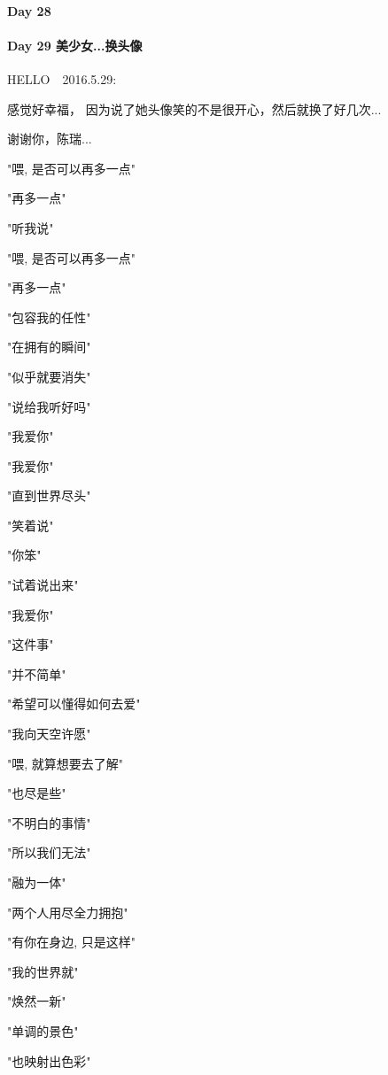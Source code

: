 \documentclass[UTF8,a4paper,8pt]{ctexbook}
\begin{document}
 	 \paragraph{Day 28      \quad     }
 	 \paragraph{Day 29  美少女...换头像  \quad     }
 	 HELLO　2016.5.29:
 	 
	 	 感觉好幸福， 因为说了她头像笑的不是很开心，然后就换了好几次... 
	 	 
	 	 谢谢你，陈瑞... 
	 	 
	 	 "喂, 是否可以再多一点"
	 	 
	 	 "再多一点"
	 	 
	 	 "听我说"
	 	 
	 	 "喂, 是否可以再多一点"
	 	 
	 	 "再多一点"
	 	 
	 	 "包容我的任性"
	 	 
	 	 "在拥有的瞬间"
	 	 
	 	 "似乎就要消失"
	 	 
	 	 "说给我听好吗"  
	 	 
	 	 "我爱你"
	 	 
	 	 "我爱你"
	 	 
	 	 "直到世界尽头"
	 	 
	 	 "笑着说"
	 	 
	 	 "你笨"
	 	 
	 	 "试着说出来"
	 	 
	 	 "我爱你" 
	 	 
	 	 "这件事"
	 	 
	 	 "并不简单"
	 	 
	 	 "希望可以懂得如何去爱"
	 	 
	 	 "我向天空许愿"
	 	 
	 	 "喂, 就算想要去了解"
	 	 
	 	 "也尽是些"
	 	 
	 	 "不明白的事情" 
	 	 
	 	 "所以我们无法"
	 	 
	 	 "融为一体"
	 	 
	 	 "两个人用尽全力拥抱"
	 	 
	 	 "有你在身边, 只是这样"
	 	 
	 	 "我的世界就"
	 	 
	 	 "焕然一新"
	 	 
	 	 "单调的景色" 
	 	 
	 	 "也映射出色彩"
	 	 
\end{document}
